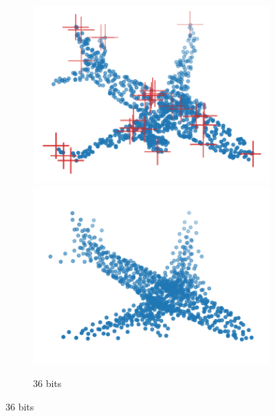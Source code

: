 \begin{figure}[t]
\begin{subfigure}[b]{\subfigureouterhspace}
\begin{subsubfigure}[b]{\subfigurehspace}
      \includegraphics[width=\linewidth]{img/point_cloud_compression/crit/test_airplane_0630/lite_3.pdf}
      \includegraphics[width=\linewidth]{img/point_cloud_compression/rec/test_airplane_0630/lite_3.pdf}
      \caption{36 bits}
      \label{fig:rec/lite/3}
    \end{subsubfigure}%
    \hfill%
    \begin{subsubfigure}[b]{\subfigurehspace}
      \centering

\end{subsubfigure}
\end{subfigure}
\end{figure}
